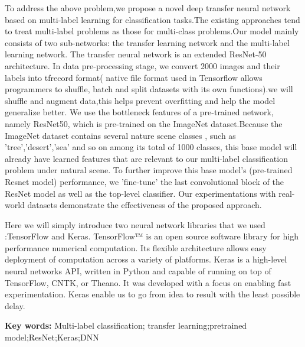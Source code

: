 {To address the above problem,we propose a novel deep transfer neural network based on 
multi-label learning for classification tasks.The existing approaches tend to treat multi-label problems as those for multi-class 
problems.Our model mainly consists of two sub-networks: the transfer learning network and the multi-label learning network.
The transfer neural network is an extended ResNet-50 architecture.
In data pre-processing stage, we convert 2000 images and their labels into tfrecord format(
native file format used in Tensorflow allows programmers to shuffle, batch and split datasets with its 
own functions).we will shuffle and augment data,this helps prevent overfitting and help the 
model generalize better. We use the bottleneck features of a pre-trained network, namely ResNet50, 
which is pre-trained on the ImageNet dataset.Because the ImageNet dataset contains several nature scene classes
, such as 'tree','desert','sea' and so on among its total of 1000 classes, this base model will
already have learned features that are relevant to our multi-label classification problem under 
natural scene. To further improve this base model's (pre-trained Resnet model) performance,
we 'fine-tune' the last convolutional block of the ResNet model as well as the top-level classifier.
Our experimentations with real-world datasets demonstrate the effectiveness of the proposed approach.

Here we will simply introduce two neural network libraries that we used :TensorFlow and Keras.
TensorFlow™ is an open source software library for high performance numerical computation. 
Its flexible architecture allows easy deployment of computation across a variety of platforms.
Keras is a high-level neural networks API, written in Python 
and capable of running on top of TensorFlow, CNTK, or Theano. It was developed with a focus on enabling 
fast experimentation. Keras enable us to go from idea to result with the least possible delay.

\par}

\vspace{-0.2\baselineskip}
\noindent\textbf{Key words: } Multi-label classification; transfer learning;pretrained model;ResNet;Keras;DNN 

\clearpage
